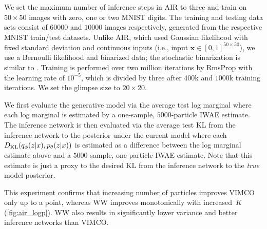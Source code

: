 We set the maximum number of inference steps in \gls{AIR} to three and train on $50 \times 50$ images with zero, one or two \acrshort{MNIST} digits.
%
The training and testing data sets consist of $60000$ and $10000$ images respectively, generated from the respective \acrshort{MNIST} train/test datasets.
%
Unlike \gls{AIR}, which used Gaussian likelihood with fixed standard deviation and continuous inputs (i.e., input $\mathbf{x} \in [0, 1]^{50 \times 50}$), we use a Bernoulli likelihood and binarized data; the stochastic binarization is similar to \citet{Burda2016importance}.
%
%
Training is performed over two million iterations by RmsProp \citep{Tieleman2012rms} with the learning rate of $10^{-5}$, which is divided by three after $400$k and $1000$k training iterations.
%
We set the glimpse size to $20 \times 20$.

We first evaluate the generative model via the average test log marginal where each log marginal is estimated by a one-sample, $5000$-particle \gls{IWAE} estimate.
%
The inference network is then evaluated via the average test \gls{KL} from the inference network to the posterior under the current model where each $D_{\mathrm{KL}}(q_\phi(z \lvert x), p_\theta(z \lvert x))$ is estimated as a difference between the log marginal estimate above and a $5000$-sample, one-particle \gls{IWAE} estimate.
%
Note that this estimate is just a proxy to the desired \gls{KL} from the inference network to the \emph{true} model posterior.
%

This experiment confirms that increasing number of particles improves \gls{VIMCO} only up to a point, whereas \gls{WW} improves monotonically with increased~\(K\) (\cref{fig:air_logp}).
%
\Gls{WW} also results in significantly lower variance and better inference networks than \gls{VIMCO}.

